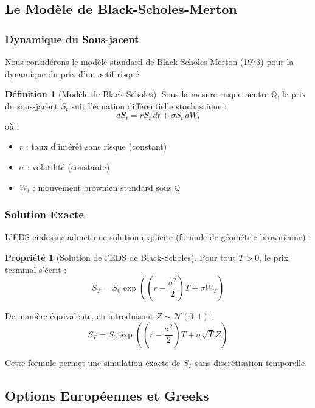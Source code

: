 \documentclass[a4paper,11pt]{article}
\theoremstyle{definition}
\newtheorem{definition}{Définition}[section]
\newtheorem{propriete}{Propriété}[section]
\begin{document}
\subsection{Le Modèle de Black-Scholes-Merton}

\subsubsection{Dynamique du Sous-jacent}

Nous considérons le modèle standard de Black-Scholes-Merton (1973) pour la dynamique du prix d'un actif risqué.

\begin{definition}[Modèle de Black-Scholes]
Sous la mesure risque-neutre $\mathbb{Q}$, le prix du sous-jacent $S_t$ suit l'équation différentielle stochastique :
$$dS_t = r S_t \, dt + \sigma S_t \, dW_t$$
où :
\begin{itemize}
    \item $r$ : taux d'intérêt sans risque (constant)
    \item $\sigma$ : volatilité (constante)
    \item $W_t$ : mouvement brownien standard sous $\mathbb{Q}$
\end{itemize}
\end{definition}

\subsubsection{Solution Exacte}

L'EDS ci-dessus admet une solution explicite (formule de géométrie brownienne) :

\begin{propriete}[Solution de l'EDS de Black-Scholes]
Pour tout $T > 0$, le prix terminal s'écrit :
$$S_T = S_0 \exp\left(\left(r - \frac{\sigma^2}{2}\right)T + \sigma W_T\right)$$

De manière équivalente, en introduisant $Z \sim \mathcal{N}(0,1)$ :
$$S_T = S_0 \exp\left(\left(r - \frac{\sigma^2}{2}\right)T + \sigma \sqrt{T} Z\right)$$
\end{propriete}

Cette formule permet une simulation exacte de $S_T$ sans discrétisation temporelle.

\subsection{Options Européennes et Greeks}
\end{document}
